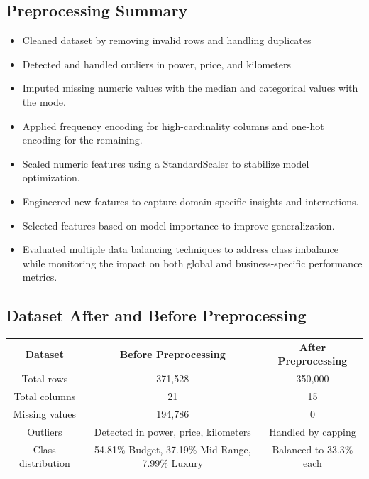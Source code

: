 \documentclass[12pt, a4paper]{article}
\begin{document}
\subsection{Preprocessing Summary}
\begin{itemize}
  \item Cleaned dataset by removing invalid rows and handling duplicates
  \item Detected and handled outliers in power, price, and kilometers
  \item Imputed missing numeric values with the median and categorical values with the mode.
  \item Applied frequency encoding for high-cardinality columns and one-hot encoding for the remaining.
  \item Scaled numeric features using a StandardScaler to stabilize model optimization.
  \item Engineered new features to capture domain-specific insights and interactions.
  \item Selected features based on model importance to improve generalization.
  \item Evaluated multiple data balancing techniques to address class imbalance while monitoring the impact on both global and business-specific performance metrics.
\end{itemize}

\subsection{Dataset After and Before Preprocessing}
\begin{center}
\renewcommand{\arraystretch}{1.4}
\begin{tabular}{c c c}
  \rowcolor{slate}
  {\color{white}\small\bfseries Dataset} &
  {\color{white}\small\bfseries Before Preprocessing} &
  {\color{white}\small\bfseries After Preprocessing} \\
  \rowcolor{lightgray} Total rows & 371,528 & 350,000 \\
  \rowcolor{white} Total columns & 21 & 15 \\
  \rowcolor{lightgray} Missing values & 194,786 & 0 \\
  \rowcolor{white} Outliers & Detected in power, price, kilometers & Handled by capping \\
  \rowcolor{lightgray} Class distribution & 54.81\% Budget, 37.19\% Mid-Range, 7.99\% Luxury & Balanced to 33.3\% each \\
\end{tabular}
\end{center}
\newpage
\end{document}
